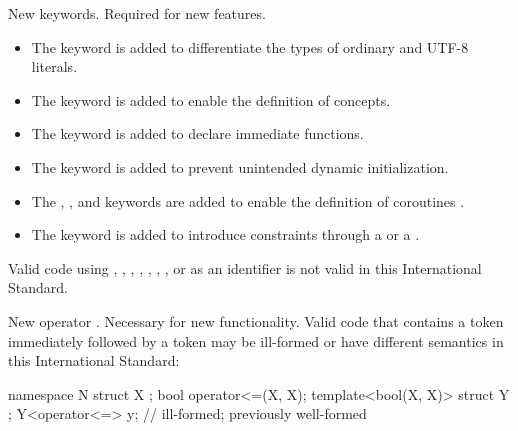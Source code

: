 \change
New keywords.
\rationale
Required for new features.
\begin{itemize}
\item
The  keyword is added to differentiate
the types of ordinary and UTF-8 literals.
\item
The  keyword is
added to enable the definition of concepts.
\item
The  keyword is added to
declare immediate functions.
\item
The  keyword is added to
prevent unintended dynamic initialization.
\item
The , , and  keywords are added
to enable the definition of coroutines .
\item
The  keyword is added
to introduce constraints through a 
or a .
\end{itemize}
\effectafteritemize
Valid \CppXVII{} code using
,
,
,
,
, , ,
or 
as an identifier is not valid in this International Standard.

\change
New operator \tcode{<=>}.
\rationale
Necessary for new functionality.
\effect
Valid \CppXVII{} code that contains a \tcode{<=} token
immediately followed by a \tcode{>} token
may be ill-formed or have different semantics in this International Standard:
\begin{codeblock}
namespace N {
  struct X {};
  bool operator<=(X, X);
  template<bool(X, X)> struct Y {};
  Y<operator<=> y;              // ill-formed; previously well-formed
}
\end{codeblock}

